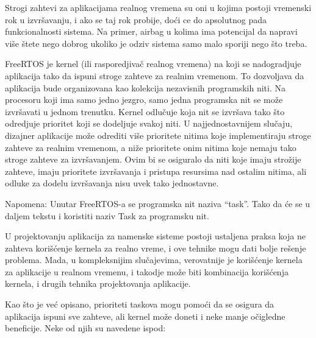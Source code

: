 \documentclass[a4paper,12pt, master]{etf}
\begin{document}
	Strogi zahtevi za aplikacijama realnog vremena su oni u kojima postoji
	vremenski rok u	izvr\v{s}avanju, i ako se taj rok probije, do\'{c}i ce do
	apsolutnog pada funkcionalnosti sistema. Na primer, airbag u kolima ima
	potencijal da napravi vi\v{s}e \v{s}tete nego dobrog ukoliko je	odziv
	sistema samo malo sporiji nego \v{s}to treba.

	FreeRTOS je kernel (ili rasporedjiva\v{c} realnog vremena) na koji se
	nadogradjuje aplikacija tako da ispuni stroge zahteve za realnim vremenom.
	To dozvoljava da aplikacija bude organizovana kao kolekcija nezavisnih
	programskih niti. Na procesoru koji ima samo jedno jezgro, samo jedna
	programska nit se mo\v{z}e izvr\v{s}avati u jednom trenutku. Kernel
	odlu\v{c}uje koja nit se izvr\v{s}ava tako \v{s}to odredjuje prioritet koji
	se dodeljuje svakoj niti. U najjednostavnijem slu\v{c}aju, dizajner
	aplikacije mo\v{z}e odrediti vi\v{s}e prioritete nitima koje implementiraju
	stroge zahteve za realnim vremenom, a ni\v{z}e prioritete onim nitima koje
	nemaju tako stroge zahteve za izvr\v{s}avanjem. Ovim bi se osiguralo da
	niti koje imaju stro\v{z}ije zahteve, imaju prioritete izvr\v{s}avanja i
	pristupa resursima nad ostalim nitima, ali odluke za dodelu izvr\v{s}avanja
	nisu uvek tako jednostavne.

	Napomena: Unutar FreeRTOS-a se programska nit naziva ``task''. Tako da
	\'{c}e se u daljem tekstu i koristiti naziv Task za programsku nit.

	U projektovanju aplikacija za namenske sisteme postoji ustaljena praksa
	koja ne zahteva kori\v{s}\'{c}enje kernela za realno vreme, i ove tehnike
	mogu dati bolje re\v{s}enje problema. Mada, u kompleksnijim slu\v{c}ajevima,
	 verovatnije je kori\v{s}\'{c}enje kernela za aplikacije u realnom vremenu,
	 i takodje mo\v{z}e biti kombinacija kori\v{s}\'{c}enja kernela, i drugih
	 tehnika projektovanja aplikacije.

	Kao \v{s}to je ve\'{c} opisano, prioriteti taskova mogu pomo\'{c}i da se
	osigura da aplikacija ispuni sve zahteve, ali kernel mo\v{z}e doneti i neke
	manje o\v{c}igledne beneficije. Neke od njih su	navedene ispod:
\end{document}
